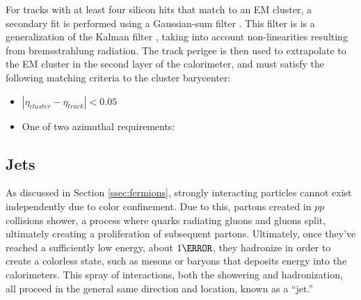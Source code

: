 For tracks with at least four silicon hits that match to an \gls{EM} cluster, a secondary fit is performed using a Gaussian-sum filter \cite{gaussian-sum-filter}. This filter is is a generalization of the Kalman filter \cite{kalman-filter}, taking into account non-linearities resulting from bremsstrahlung radiation. The track perigee is then used to extrapolate to the \gls{EM} cluster in the second layer of the calorimeter, and must satisfy the following matching criteria to the cluster barycenter:
\begin{itemize}
    \item $|\eta_{cluster} - \eta_{track}| < 0.05$
    \item One of two azimuthal requirements:
\end{itemize}





\subsection{Jets} \label{ssec:jet-reco}
As discussed in Section \ref{ssec:fermions}, strongly interacting particles cannot exist independently due to color confinement. Due to this, partons created in $pp$ collisions shower, a process where quarks radiating gluons and gluons split, ultimately creating a proliferation of subsequent partons. Ultimately, once they've reached a sufficiently low energy, about $\unit{1}{\GeV}$, they hadronize in order to create a colorless state, such as mesons or baryons that deposits energy into the calorimeters. This spray of interactions, both the showering and hadronization, all proceed in the general same direction and location, known as a ``jet.''

